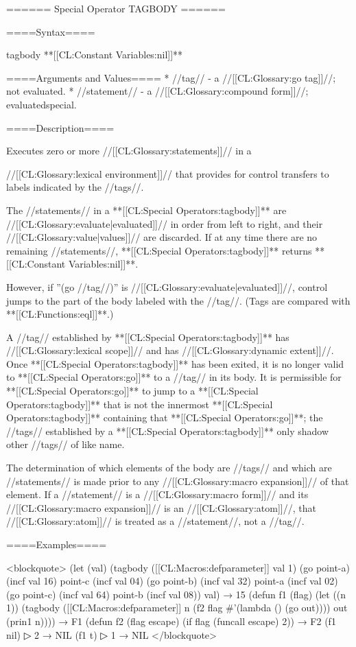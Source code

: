 ====== Special Operator TAGBODY ======

====Syntax====

\DefspecWithValues tagbody {} {**[[CL:Constant Variables:nil]]**}

====Arguments and Values====
  * //tag// - a //[[CL:Glossary:go tag]]//; not evaluated.
  * //statement// - a //[[CL:Glossary:compound form]]//; evaluatedspecial.

====Description====

Executes zero or more //[[CL:Glossary:statements]]// in a

//[[CL:Glossary:lexical environment]]// that provides for control transfers to labels indicated by the //tags//.

The //statements// in a **[[CL:Special Operators:tagbody]]** are //[[CL:Glossary:evaluate|evaluated]]// in order from left to right, and their //[[CL:Glossary:value|values]]// are discarded. If at any time there are no remaining //statements//, **[[CL:Special Operators:tagbody]]** returns **[[CL:Constant Variables:nil]]**.

However, if ''(go //tag//)'' is //[[CL:Glossary:evaluate|evaluated]]//, control jumps to the part of the body labeled with the //tag//. (Tags are compared with **[[CL:Functions:eql]]**.)

A //tag// established by **[[CL:Special Operators:tagbody]]** has //[[CL:Glossary:lexical scope]]// and has //[[CL:Glossary:dynamic extent]]//. Once **[[CL:Special Operators:tagbody]]** has been exited, it is no longer valid to **[[CL:Special Operators:go]]** to a //tag// in its body. It is permissible for **[[CL:Special Operators:go]]** to jump to a **[[CL:Special Operators:tagbody]]** that is not the innermost **[[CL:Special Operators:tagbody]]** containing that **[[CL:Special Operators:go]]**; the //tags// established by a **[[CL:Special Operators:tagbody]]** only shadow other //tags// of like name.

The determination of which elements of the body are //tags// and which are //statements// is made prior to any //[[CL:Glossary:macro expansion]]// of that element. If a //statement// is a //[[CL:Glossary:macro form]]// and its //[[CL:Glossary:macro expansion]]// is an //[[CL:Glossary:atom]]//, that //[[CL:Glossary:atom]]// is treated as a //statement//, not a //tag//.

====Examples====

<blockquote> (let (val) (tagbody ([[CL:Macros:defparameter]] val 1) (go point-a) (incf val 16) point-c (incf val 04) (go point-b) (incf val 32) point-a (incf val 02) (go point-c) (incf val 64) point-b (incf val 08)) val) → 15 (defun f1 (flag) (let ((n 1)) (tagbody ([[CL:Macros:defparameter]] n (f2 flag #'(lambda () (go out)))) out (prin1 n)))) → F1 (defun f2 (flag escape) (if flag (funcall escape) 2)) → F2 (f1 nil)
▷ 2 → NIL (f1 t)
▷ 1 → NIL </blockquote>

